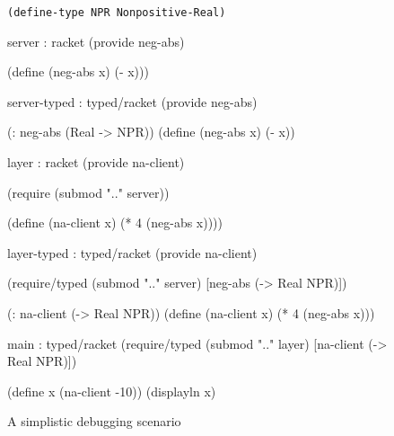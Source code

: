 \begin{figure}\footnotesize

\centerline{\tt (define-type NPR Nonpositive-Real)}

\vspace\spacr

\begin{module}{server : racket}{\dyncolor}
(provide neg-abs)

(define (neg-abs x) (- x)))
\end{module}\hfill\begin{module}{server-typed : typed/racket}{\typecolor}
(provide neg-abs)

(: neg-abs (Real -> NPR))
(define (neg-abs x) (- x))
\end{module}

\vspace\spacr

\begin{module}{layer : racket}{\dyncolor}
(provide na-client)

(require (submod ".." server))

(define (na-client x)
  (* 4 (neg-abs x))))
\end{module}\hfill\begin{module}{layer-typed : typed/racket}{\typecolor}
(provide na-client)

(require/typed
 (submod ".." server)
 [neg-abs (-> Real NPR)])

(: na-client (-> Real NPR))
(define (na-client x)
  (* 4 (neg-abs x)))
\end{module}

\vspace\spacr

\begin{center}\begin{module}{main : typed/racket}{\typecolor}
(require/typed
  (submod ".." layer)
  [na-client (-> Real NPR)])

(define x (na-client -10))
(displayln x)
\end{module}\end{center}

\caption{A simplistic debugging scenario} \label{fig:rational}
\end{figure}
